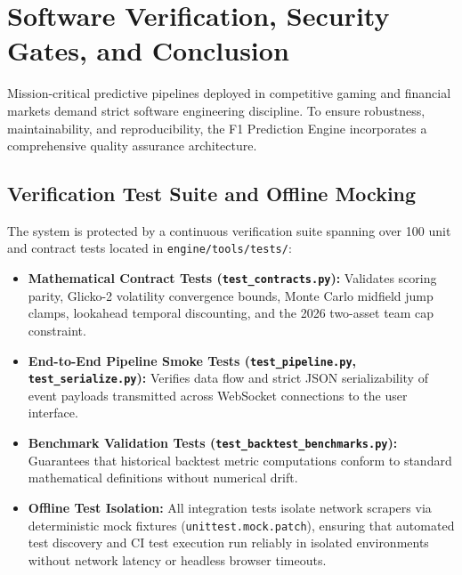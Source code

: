 \section{Software Verification, Security Gates, and Conclusion}
\label{sec:quality_assurance_verification}

Mission-critical predictive pipelines deployed in competitive gaming and financial markets demand strict software engineering discipline. To ensure robustness, maintainability, and reproducibility, the F1 Prediction Engine incorporates a comprehensive quality assurance architecture.

\subsection{Verification Test Suite and Offline Mocking}
The system is protected by a continuous verification suite spanning over 100 unit and contract tests located in \texttt{engine/tools/tests/}:
\begin{itemize}
    \item \textbf{Mathematical Contract Tests (\texttt{test\_contracts.py}):} Validates scoring parity, Glicko-2 volatility convergence bounds, Monte Carlo midfield jump clamps, lookahead temporal discounting, and the 2026 two-asset team cap constraint.
    \item \textbf{End-to-End Pipeline Smoke Tests (\texttt{test\_pipeline.py}, \texttt{test\_serialize.py}):} Verifies data flow and strict JSON serializability of event payloads transmitted across WebSocket connections to the user interface.
    \item \textbf{Benchmark Validation Tests (\texttt{test\_backtest\_benchmarks.py}):} Guarantees that historical backtest metric computations conform to standard mathematical definitions without numerical drift.
    \item \textbf{Offline Test Isolation:} All integration tests isolate network scrapers via deterministic mock fixtures (\texttt{unittest.mock.patch}), ensuring that automated test discovery and CI test execution run reliably in isolated environments without network latency or headless browser timeouts.
\end{itemize}

